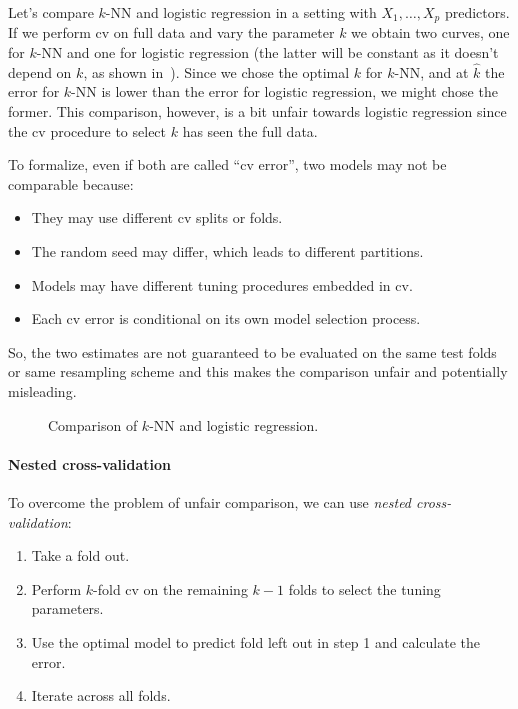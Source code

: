 \begin{example}
    Let's compare $k$-NN and logistic regression in a setting with $X_1, \ldots, X_p$ predictors. If we perform \acs{cv} on full data and vary the parameter $k$ we obtain two curves, one for $k$-NN and one for logistic regression (the latter will be constant as it doesn't depend on $k$, as shown in~). Since we chose the optimal $k$ for $k$-NN, and at $\hat{k}$ the error for $k$-NN is lower than the error for logistic regression, we might chose the former. This comparison, however, is a bit unfair towards logistic regression since the \acs{cv} procedure to select $k$ has seen the full data.
\end{example}

To formalize, even if both are called ``\acs{cv} error''\negthinspace, two models may not be comparable because:
\begin{itemize}
    \item They may use different \acs{cv} splits or folds.
    \item The random seed may differ, which leads to different partitions.
    \item Models may have different tuning procedures embedded in \acs{cv}.
    \item Each \acs{cv} error is conditional on its own model selection process.
\end{itemize}
So, the two estimates are not guaranteed to be evaluated on the same test folds or same resampling scheme and this makes the comparison unfair and potentially misleading.

\begin{figure}
    \centering
    \caption{Comparison of $k$-NN and logistic regression.}
    \label{fig:cv_comparison}
\end{figure}

\paragraph{Nested cross-validation} To overcome the problem of unfair comparison, we can use \emph{nested cross-validation}:
\begin{enumerate}
    \item Take a fold out.
    \item Perform $k$-fold \acs{cv} on the remaining $k-1$ folds to select the tuning parameters.
    \item Use the optimal model to predict fold left out in step 1 and calculate the error.
    \item Iterate across all folds.
\end{enumerate}